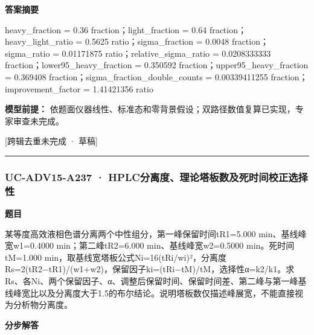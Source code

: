 \documentclass[UTF8,11pt,a4paper]{ctexart}
\begin{document}
\noindent\textbf{答案摘要}\par
heavy\_fraction = 0.36 fraction；light\_fraction = 0.64 fraction；heavy\_light\_ratio = 0.5625 ratio；sigma\_fraction = 0.0048 fraction；sigma\_ratio = 0.01171875 ratio；relative\_sigma\_ratio = 0.0208333333 fraction；lower95\_heavy\_fraction = 0.350592 fraction；upper95\_heavy\_fraction = 0.369408 fraction；sigma\_fraction\_double\_counts = 0.00339411255 fraction；improvement\_factor = 1.41421356 ratio\par
\noindent\textbf{模型前提：}
依题面仪器线性、标准态和零背景假设；双路径数值复算已实现，专家审查未完成。\par
\noindent\textcolor{red!65!black}{[跨辑去重未完成 · 草稿]} \par
\medskip\hrule\medskip
{}
\subsubsection*{UC-ADV15-A237 · HPLC分离度、理论塔板数及死时间校正选择性}
\noindent\textbf{题目}\par
某等度高效液相色谱分离两个中性组分，第一峰保留时间tR1=5.000 min、基线峰宽w1=0.4000 min；第二峰tR2=6.000 min、基线峰宽w2=0.5000 min。死时间tM=1.000 min，取基线宽塔板公式Ni=16(tRi/wi)²，分离度Rs=2(tR2−tR1)/(w1+w2)，保留因子ki=(tRi−tM)/tM，选择性α=k2/k1。求Rs、各Ni、两个保留因子、α、调整后保留时间、保留时间差、第二峰与第一峰基线峰宽比以及分离度大于1.5的布尔结论。说明塔板数仅描述峰展宽，不能直接视为分析物分离度。\par
\medskip\noindent\textbf{分步解答}
\end{document}
